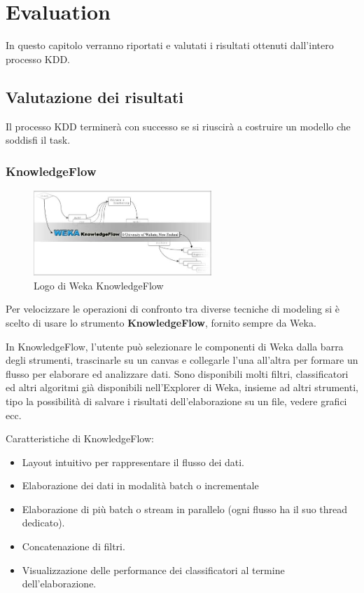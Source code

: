 \chapter{Evaluation}
\label{ch:eval}
In questo capitolo verranno riportati e valutati i risultati ottenuti dall’intero processo KDD.

\section{Valutazione dei risultati}

Il processo KDD terminerà con successo se si riuscirà a costruire un modello che soddisfi il task.
\subsection{KnowledgeFlow}

\begin{figure}[hbtp!]
	\centering
	\includegraphics[width=0.6\textwidth]{./images/kf}
  	\caption{Logo di Weka KnowledgeFlow}  
\end{figure}

Per velocizzare le operazioni di confronto tra diverse tecniche di modeling si è scelto di usare lo strumento \textbf{KnowledgeFlow}, fornito sempre da Weka.

In KnowledgeFlow, l'utente può selezionare le componenti di Weka dalla barra degli strumenti, trascinarle su un canvas e collegarle l'una all'altra per formare un flusso per elaborare ed analizzare dati. Sono disponibili molti filtri, classificatori ed altri algoritmi già disponibili nell'Explorer di Weka, insieme ad altri strumenti, tipo la possibilità di salvare i risultati dell'elaborazione su un file, vedere grafici ecc.

Caratteristiche di KnowledgeFlow:
\begin{itemize}
	\item Layout intuitivo per rappresentare il flusso dei dati.
	\item Elaborazione dei dati in modalità batch o incrementale
    \item Elaborazione di più batch o stream in parallelo (ogni flusso ha il suo thread dedicato).
    \item Concatenazione di filtri.
    \item Visualizzazione delle performance dei classificatori al termine dell'elaborazione.
\end{itemize}

